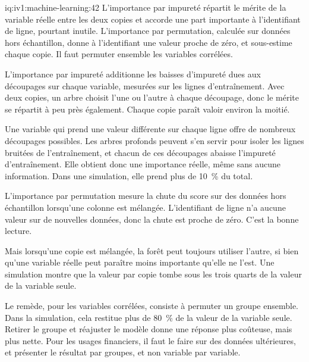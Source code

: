 \begin{solution}{iq:iv1:machine-learning:42}
L'importance par impureté répartit le mérite de la variable réelle entre les deux copies et accorde une part importante à l'identifiant de ligne, pourtant inutile. L'importance par permutation, calculée sur données hors échantillon, donne à l'identifiant une valeur proche de zéro, et sous-estime chaque copie. Il faut permuter ensemble les variables corrélées.

L'importance par impureté additionne les baisses d'impureté dues aux découpages sur chaque variable, mesurées sur les lignes d'entraînement. Avec deux copies, un arbre choisit l'une ou l'autre à chaque découpage, donc le mérite se répartit à peu près également. Chaque copie paraît valoir environ la moitié.

Une variable qui prend une valeur différente sur chaque ligne offre de nombreux découpages possibles. Les arbres profonds peuvent s'en servir pour isoler les lignes bruitées de l'entraînement, et chacun de ces découpages abaisse l'impureté d'entraînement. Elle obtient donc une importance réelle, même sans aucune information. Dans une simulation, elle prend plus de 10~\% du total.

L'importance par permutation mesure la chute du score sur des données hors échantillon lorsqu'une colonne est mélangée. L'identifiant de ligne n'a aucune valeur sur de nouvelles données, donc la chute est proche de zéro. C'est la bonne lecture.

Mais lorsqu'une copie est mélangée, la forêt peut toujours utiliser l'autre, si bien qu'une variable réelle peut paraître moins importante qu'elle ne l'est. Une simulation montre que la valeur par copie tombe sous les trois quarts de la valeur de la variable seule.

Le remède, pour les variables corrélées, consiste à permuter un groupe ensemble. Dans la simulation, cela restitue plus de 80~\% de la valeur de la variable seule. Retirer le groupe et réajuster le modèle donne une réponse plus coûteuse, mais plus nette. Pour les usages financiers, il faut le faire sur des données ultérieures, et présenter le résultat par groupes, et non variable par variable.



\end{solution}

